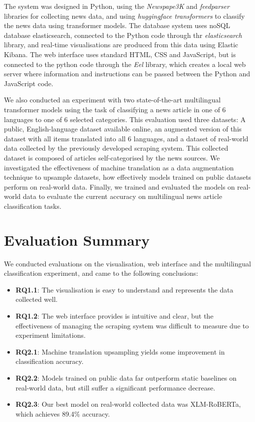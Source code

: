 \documentclass{l4proj}
\begin{document}
The system was designed in Python, using the \emph{Newspape3K} and \emph{feedparser} libraries for collecting news data, and using \emph{huggingface transformers} to classify the news data using transformer models. The database system uses noSQL database elasticsearch, connected to the Python code through thr \emph{elasticsearch} library, and real-time visualisations are produced from this data using Elastic Kibana. The web interface uses standard HTML, CSS and JavaScript, but is connected to the python code through the \emph{Eel} library, which creates a local web server where information and instructions can be passed between the Python and JavaScript code.

We also conducted an experiment with two state-of-the-art multilingual transformer models using the task of classifying a news article in one of 6 languages to one of 6 selected categories. This evaluation used three datasets: A public, English-language dataset available online, an augmented version of this dataset with all items translated into all 6 languages, and a dataset of real-world data collected by the previously developed scraping system. This collected dataset is composed of articles self-categorised by the news sources. We investigated the effectiveness of machine translation as a data augmentation technique to upsample datasets, how effectively models trained on public datasets perform on real-world data. Finally, we trained and evaluated the models on real-world data to evaluate the current accuracy on multilingual news article classification tasks.

\section{Evaluation Summary}
We conducted evaluations on the visualisation, web interface and the multilingual classification experiment, and came to the following conclusions:
\begin{itemize}
    \item \textbf{RQ1.1}: The visualisation is easy to understand and represents the data collected well.
    \item \textbf{RQ1.2}: The web interface provides is intuitive and clear, but the effectiveness of managing the scraping system was difficult to measure due to experiment limitations.
    \item \textbf{RQ2.1}: Machine translation upsampling yields some improvement in classification accuracy.
    \item \textbf{RQ2.2}: Models trained on public data far outperform static baselines on real-world data, but still suffer a significant performance decrease.
    \item \textbf{RQ2.3}: Our best model on real-world collected data  was XLM-RoBERTa, which achieves 89.4\% accuracy.
\end{itemize}
\end{document}
